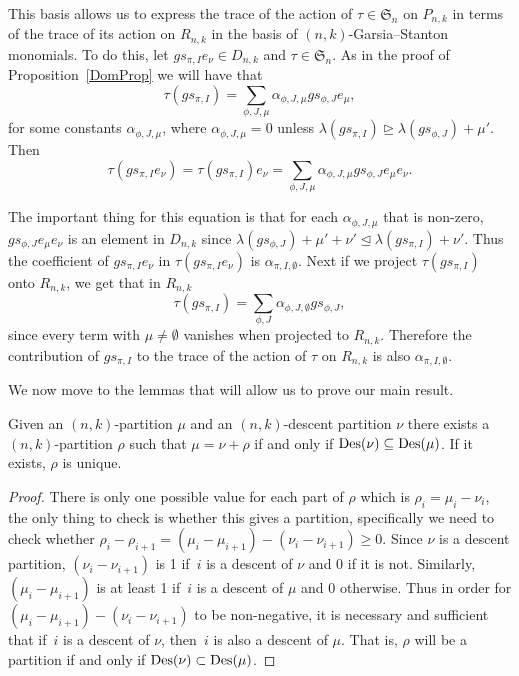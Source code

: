 \documentclass[10pt]{article}
\begin{document}
This basis allows us to express the trace of the action of $\tau \in \mathfrak{S}_n$ on $P_{n,k}$ in terms of the trace of its 
action on $R_{n,k}$ in the basis of $(n,k)$-Garsia--Stanton monomials. To do this, let $gs_{\pi,I}e_\nu\in D_{n,k}$ and 
$\tau\in\mathfrak{S}_n$. As in the proof of Proposition~\ref{DomProp} we will have that 
\begin{equation}
\tau(gs_{\pi,I})=\sum_{\phi,J,\mu} \alpha_{\phi,J,\mu} gs_{\phi,J}e_\mu,
\end{equation}
for some constants $\alpha_{\phi,J,\mu}$, 
where $\alpha_{\phi,J,\mu}=0$ unless $\lambda(gs_{\pi,I}) \trianglerighteq \lambda(gs_{\phi,J})+\mu'$. Then 
\begin{equation}
\tau(gs_{\pi,I}e_\nu)=\tau(gs_{\pi,I})e_\nu=\sum_{\phi,J,\mu} \alpha_{\phi,J,\mu} gs_{\phi,J}e_\mu e_\nu.
\end{equation}

The important thing for this equation is that for each $\alpha_{\phi,J,\mu}$ that is non-zero, $gs_{\phi,J}e_\mu e_\nu$ is an 
element in $D_{n,k}$ since $\lambda(gs_{\phi,J})+\mu'+\nu'\trianglelefteq \lambda(gs_{\pi,I})+\nu'$. Thus the coefficient of 
$gs_{\pi,I}e_\nu$ in $\tau(gs_{\pi,I}e_\nu)$ is $\alpha_{\pi,I,\emptyset}$. Next if we project $\tau(gs_{\pi,I})$ onto 
$R_{n,k}$, we get that in $R_{n,k}$ 
\begin{equation}
\tau(gs_{\pi,I})=\sum_{\phi,J} \alpha_{\phi,J,\emptyset} 
gs_{\phi,J},
\end{equation}
 since every term with $\mu\neq \emptyset$ vanishes when projected to $R_{n,k}$. Therefore the 
contribution of $gs_{\pi,I}$ to the trace of the action of $\tau$ on $R_{n,k}$ is also $\alpha_{\pi,I,\emptyset}$.


We now move to the lemmas that will allow us to prove our main result.
	
\begin{lemm}

\label{DecomLem}
 Given an $(n,k)$-partition $\mu$ and an $(n,k)$-descent partition $\nu$ there exists a $(n,k)$-partition $\rho$ such that 
$\mu=\nu+\rho$ if and only if $\operatorname{Des} (\nu)\subseteq \operatorname{Des} (\mu)$. If it exists, $\rho$ is unique.

	\begin{proof}
		There is only one possible value for each part of $\rho$ which is $\rho_i=\mu_i-\nu_i$, the only thing to check is 
whether this gives a partition, specifically we need to check whether 
$\rho_i-\rho_{i+1}=(\mu_i-\mu_{i+1})-(\nu_i-\nu_{i+1})\geq 0$. Since $\nu$ is a descent partition, $(\nu_i-\nu_{i+1})$ 
is 1 if~$i$ is a descent of $\nu$ and 0 if it is not. Similarly, $(\mu_i-\mu_{i+1})$ is at least 1 if~$i$ is a 
descent of $\mu$ and 0 otherwise. Thus in order for $(\mu_i-\mu_{i+1})-(\nu_i-\nu_{i+1})$ to be non-negative, it is 
necessary and sufficient that if~$i$ is a descent of $\nu$, then~$i$ is also a descent of $\mu$. That is, $\rho$ 
will be a partition if and only if $\operatorname{Des} (\nu)\subset \operatorname{Des} (\mu)$.
	\end{proof}
\end{lemm}
\end{document}
